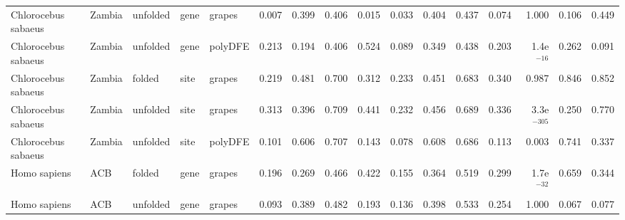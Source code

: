 \begin{longtable}{lllllrrrrrrrrrrr}
 Chlorocebus sabaeus &                    Zambia &  unfolded &  gene &   grapes &                              0.007 &                               0.399 &                 0.406 &                 0.015 &                              0.033 &                               0.404 &                 0.437 &                 0.074 &         1.000 &  0.106 &  0.449 \\
 Chlorocebus sabaeus &                    Zambia &  unfolded &  gene &  polyDFE &                              0.213 &                               0.194 &                 0.406 &                 0.524 &                              0.089 &                               0.349 &                 0.438 &                 0.203 &  1.4e$^{-16}$ &  0.262 &  0.091 \\
 Chlorocebus sabaeus &                    Zambia &    folded &  site &   grapes &                              0.219 &                               0.481 &                 0.700 &                 0.312 &                              0.233 &                               0.451 &                 0.683 &                 0.340 &         0.987 &  0.846 &  0.852 \\
 Chlorocebus sabaeus &                    Zambia &  unfolded &  site &   grapes &                              0.313 &                               0.396 &                 0.709 &                 0.441 &                              0.232 &                               0.456 &                 0.689 &                 0.336 & 3.3e$^{-305}$ &  0.250 &  0.770 \\
 Chlorocebus sabaeus &                    Zambia &  unfolded &  site &  polyDFE &                              0.101 &                               0.606 &                 0.707 &                 0.143 &                              0.078 &                               0.608 &                 0.686 &                 0.113 &         0.003 &  0.741 &  0.337 \\
        Homo sapiens &                       ACB &    folded &  gene &   grapes &                              0.196 &                               0.269 &                 0.466 &                 0.422 &                              0.155 &                               0.364 &                 0.519 &                 0.299 &  1.7e$^{-32}$ &  0.659 &  0.344 \\
        Homo sapiens &                       ACB &  unfolded &  gene &   grapes &                              0.093 &                               0.389 &                 0.482 &                 0.193 &                              0.136 &                               0.398 &                 0.533 &                 0.254 &         1.000 &  0.067 &  0.077 \\

\end{longtable}
